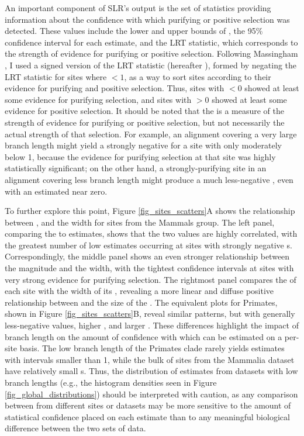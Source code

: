 An important component of SLR's output is the set of statistics
providing information about the confidence with which purifying or
positive selection was detected. These values include the lower and
upper bounds of \ci, the 95\% confidence interval for each \omgml
estimate, and the LRT statistic, which corresponds to the strength of
evidence for purifying or positive selection. Following Massingham
\citeyearpar{Massingham2005}, I used a signed version of the LRT
statistic (hereafter \slrt), formed by negating the LRT statistic for
sites where \omgml$<1$, as a way to sort sites according to their
evidence for purifying and positive selection. Thus, sites with
\slrt$<0$ showed at least some evidence for purifying selection, and
sites with \slrt$>0$ showed at least some evidence for positive
selection. It should be noted that the \slrt is a measure of the
strength of evidence for purifying or positive selection, but not
necessarily the actual strength of that selection. For example, an
alignment covering a very large branch length might yield a strongly
negative \slrt for a site with \omgml only moderately below 1, because
the evidence for purifying selection at that site was highly
statistically significant; on the other hand, a strongly-purifying
site in an alignment covering less branch length might produce a much
less-negative \slrt, even with an estimated  \omgml near zero.

To further explore this point, Figure \ref{fig_sites_scatters}A shows
the relationship between \slrt, \omgml and the \ci width for sites
from the Mammals group. The left panel, comparing the \slrt to \nz
\omgml estimates, shows that the two values are highly correlated,
with the greatest number of low \omgml estimates occurring at sites
with strongly negative \slrt{}s. Correspondingly, the middle panel
shows an even stronger relationship between the \slrt magnitude and
the \ci width, with the tightest confidence intervals at sites with
very strong evidence for purifying selection. The rightmost panel
compares the \omgml of each site with the width of its \ci, revealing
a more linear and diffuse positive relationship between \omgml and the
size of the \ci. The equivalent plots for Primates, shown in Figure
\ref{fig_sites_scatters}B, reveal similar patterns, but with generally
less-negative \slrt values, higher \omgml, and larger \ci. These
differences highlight the impact of branch length on the amount of
confidence with which \omg can be estimated on a per-site basis. The
low branch length of the Primates clade rarely yields \omgml estimates
with \ci intervals smaller than 1, while the bulk of sites from the
Mammalia dataset have relatively small \ci{}s. Thus, the distribution
of \omgml estimates from datasets with low branch lengths (e.g., the
histogram densities seen in Figure \ref{fig_global_distributions})
should be interpreted with caution, as any comparison between \omgml
from different sites or datasets may be more sensitive to the amount
of statistical confidence placed on each estimate than to any
meaningful biological difference between the two sets of data.

